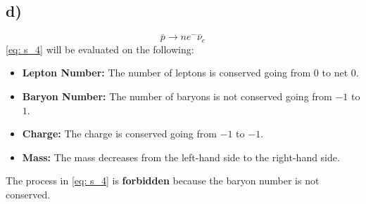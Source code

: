 \documentclass{article}
\begin{document}
\subsection*{d)}
\begin{equation}\label{eq: s_4}
\bar{p} → ne^{-}\bar{ν}_e
\end{equation}
\cref{eq: s_4} will be evaluated on the following:
\begin{itemize}
    \item \textbf{Lepton Number:} The number of leptons is conserved going from 0 to net 0.
    \item \textbf{Baryon Number:} The number of baryons is not conserved going from $-1$ to $1$.
    \item \textbf{Charge:} The charge is conserved going from $-1$ to $-1$.
    \item \textbf{Mass:} The mass decreases from the left-hand side to the right-hand side.
\end{itemize}
The process in \cref{eq: s_4} is \textbf{forbidden} because the baryon number is not conserved. 
\end{document}
